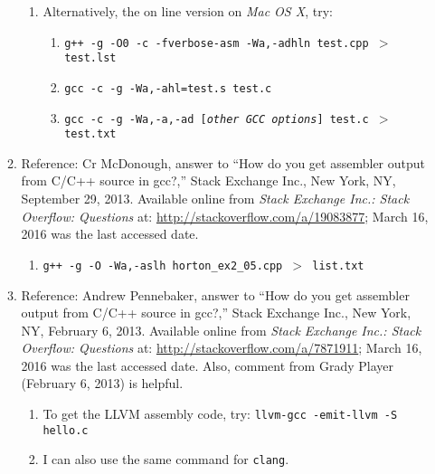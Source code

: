 \begin{enumerate}
\begin{enumerate}
\begin{enumerate}
		\item Alternatively, the on line version on {\it Mac OS X}, try: \vspace{-0.1cm}
			\begin{enumerate} \itemsep -1pt
			\item {\tt g++ -g -O0 -c -fverbose-asm -Wa,-adhln test.cpp $>$ test.lst}
			\item {\tt gcc -c -g -Wa,-ahl=test.s test.c}
			\item {\tt gcc -c -g -Wa,-a,-ad [{\it other GCC options}] test.c $>$ test.txt}
			\end{enumerate}
		\end{enumerate}
	\item Reference: Cr McDonough, answer to ``How do you get assembler output from C/C++ source in gcc?,'' Stack Exchange Inc., New York, NY, September 29, 2013. Available online from {\it Stack Exchange Inc.: Stack Overflow: Questions} at: \url{http://stackoverflow.com/a/19083877}; March 16, 2016 was the last accessed date. \vspace{-0.2cm}
		\begin{enumerate} \itemsep -2pt
		\item {\tt g++ -g -O -Wa,-aslh horton\_ex2\_05.cpp $>$ list.txt}
		\end{enumerate}
	\item Reference: Andrew Pennebaker, answer to ``How do you get assembler output from C/C++ source in gcc?,'' Stack Exchange Inc., New York, NY, February 6, 2013. Available online from {\it Stack Exchange Inc.: Stack Overflow: Questions} at: \url{http://stackoverflow.com/a/7871911}; March 16, 2016 was the last accessed date. Also, comment from Grady Player (February 6, 2013) is helpful. \vspace{-0.2cm}
		\begin{enumerate} \itemsep -2pt
		\item To get the LLVM assembly code, try: {\tt llvm-gcc -emit-llvm -S hello.c}
		\item I can also use the same command for {\tt clang}.
		\end{enumerate}
	\end{enumerate}
\end{enumerate}























